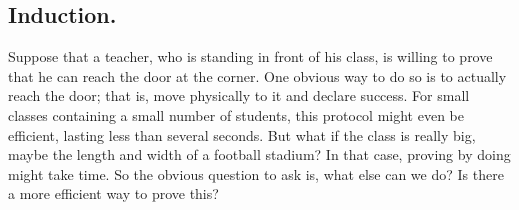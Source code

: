 
\subsection{Induction.}


Suppose that a teacher, who is standing in front of his class, is willing to prove that he can reach the door at the corner. One obvious way to do so is to actually reach the door; that is, move physically to it and declare success. For small classes containing a small number of students, this protocol might even be efficient, lasting less than several seconds. But what if the class is really big, maybe the length and width of a football stadium? In that case, proving by doing might take time. So the obvious question to ask is, what else can we do? Is there a more efficient way to prove this?


